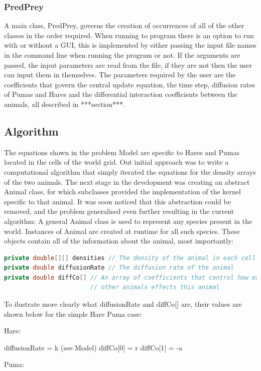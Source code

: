 \documentclass[11pt]{report}
\begin{document}
\subsubsection{PredPrey}
\label{sec:PredPrey}
 A main class, PredPrey, governs the creation of occurrences of all of the other classes in the order required.  When running to program there is an option to run with or without a GUI, this is  implemented by either passing the input file names in the command line when running the program or not. If the arguments are passed, the input parameters are read from the file, if they are not then the user can input them in themselves. The parameters required by the user are the coefficients that govern the central update equation, the time step, diffusion rates of Pumas and Hares and the differential interaction coefficients between the animals, all described in ***section***.
      \subsection{Algorithm} %
      The equations shown in the problem Model are specific to Hares and Pumas located in the cells of the world grid. Out initial approach was to write a computational algorithm that simply iterated the equations for the density arrays of the two animals. The next stage in the development was creating an abstract Animal class, for which subclasses provided the implementation of the kernel specific to that animal. It was soon noticed that this abstraction could be removed, and the problem generalised even further resulting in the current algorithm: A general Animal class is used to represent any species present in the world. Instances of Animal are created at runtime for all such species. These objects contain all of the information about the animal, most importantly: \begin{lstlisting}[language=Java]
private double[][] densities // The density of the animal in each cell      
private double diffusionRate // The diffusion rate of the animal
private double diffCo[] // An array of coefficients that control how each of the 
					    // other animals effects this animal
\end{lstlisting}
      To ilustrate more clearly what diffusionRate and diffCo[] are, their values are shown below for the simple Hare Puma case:
      
      
Hare:

diffusionRate = k (see Model)
diffCo[0] = r
diffCo[1] = -a

Puma:
\end{document}
